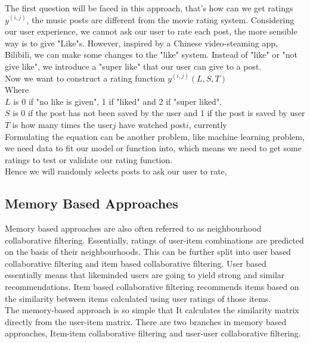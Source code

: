 The first question will be faced in this approach, that's how can we get ratings $y^{(i,j)}$, the music posts are different from the movie rating system. Considering our user experience,
we cannot ask our user to rate each post, the more sensible way is to give "Like"s. However, inspired by a Chinese video-steaming app, Bilibili, we can make some changes to the "like" system. 
Instead of "like" or "not give like", we introduce a "super like" that our user can give to a post.
\\Now we want to construct a rating function $y^{(i,j)}(L,S,T)$
\\Where 
\\$L$ is 0 if "no like is given", 1 if "liked" and 2 if "super liked", 
\\$S$ is 0 if the post has not been saved by the user and 1 if the post is saved by user
\\$T$ is how many times the user$j$ have watched post$i$, currently 
\\Formulating the equation can be another problem, like machine learning problem, we need data to fit our model or function into, which means we need to get some ratings to test or validate our rating function.
\\Hence we will randomly selects posts to ask our user to rate, 



\subsection{Memory Based Approaches}
Memory based approaches are also often referred to as neighbourhood collaborative filtering. Essentially, ratings of user-item combinations are predicted on the basis of their neighbourhoods. 
This can be further split into user based collaborative filtering and item based collaborative filtering. 
User based essentially means that likeminded users are going to yield strong and similar recommendations. Item based collaborative filtering recommends items based on the similarity between items calculated using user ratings of those items.
\\The memory-based approach is so simple that It calculates the similarity matrix directly from the user-item matrix. There are two branches in memory based approaches, Item-item collaborative filtering and user-user collaborative filtering.


